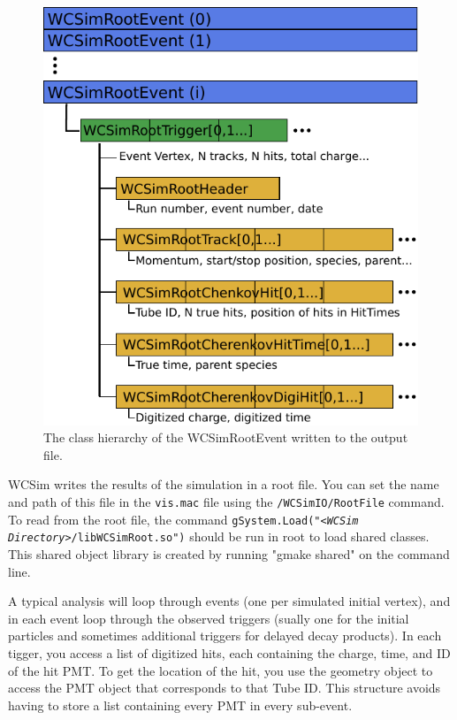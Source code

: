 \begin{figure}[t!]
  \begin{center}
\includegraphics{rootfile}
  \end{center}
\caption{The class hierarchy of the WCSimRootEvent written to the output file.} \label{fig:rootfile}
\end{figure}

WCSim writes the results of the simulation in a root file. You can set the name and path of this file in the \texttt{vis.mac} file using the \texttt{/WCSimIO/RootFile} command.  To read from the root file, the command \texttt{gSystem.Load("<\emph{WCSim Directory}>/libWCSimRoot.so")} should be run in root to load shared classes.  This shared object library is created by running "gmake shared" on the command line.

A typical analysis will loop through events (one per simulated initial vertex), and in each event loop through the observed triggers (sually one for the initial particles and sometimes additional triggers for delayed decay products).  In each tigger, you access a list of digitized hits, each containing the charge, time, and ID of the hit PMT.  To get the location of the hit, you use the geometry object to access the PMT object that corresponds to that Tube ID.  This structure avoids having to store a list containing every PMT in every sub-event.

